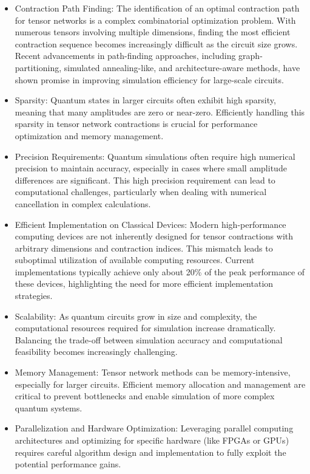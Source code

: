 \documentclass[12pt,oneside,a4paper]{article}
\begin{document}
\begin{itemize}
    \item Contraction Path Finding: The identification of an optimal contraction path for tensor networks is a complex combinatorial optimization problem. With numerous tensors involving multiple dimensions, finding the most efficient contraction sequence becomes increasingly difficult as the circuit size grows. Recent advancements in path-finding approaches, including graph-partitioning, simulated annealing-like, and architecture-aware methods, have shown promise in improving simulation efficiency for large-scale circuits.
    \item Sparsity: Quantum states in larger circuits often exhibit high sparsity, meaning that many amplitudes are zero or near-zero. Efficiently handling this sparsity in tensor network contractions is crucial for performance optimization and memory management.
    \item Precision Requirements: Quantum simulations often require high numerical precision to maintain accuracy, especially in cases where small amplitude differences are significant. This high precision requirement can lead to computational challenges, particularly when dealing with numerical cancellation in complex calculations.
    \item Efficient Implementation on Classical Devices: Modern high-performance computing devices are not inherently designed for tensor contractions with arbitrary dimensions and contraction indices. This mismatch leads to suboptimal utilization of available computing resources. Current implementations typically achieve only about 20\% of the peak performance of these devices, highlighting the need for more efficient implementation strategies.
    \item Scalability: As quantum circuits grow in size and complexity, the computational resources required for simulation increase dramatically. Balancing the trade-off between simulation accuracy and computational feasibility becomes increasingly challenging.
    \item Memory Management: Tensor network methods can be memory-intensive, especially for larger circuits. Efficient memory allocation and management are critical to prevent bottlenecks and enable simulation of more complex quantum systems.
    \item Parallelization and Hardware Optimization: Leveraging parallel computing architectures and optimizing for specific hardware (like FPGAs or GPUs) requires careful algorithm design and implementation to fully exploit the potential performance gains.
\end{itemize}
\end{document}
